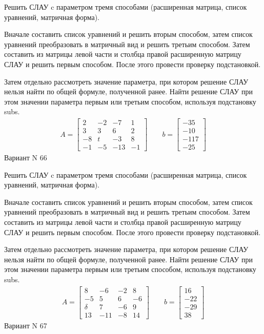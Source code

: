 \documentclass[11pt]{report}
\begin{document}
Решить СЛАУ c параметром тремя способами (расширенная матрица, список уравнений, матричная форма).

Вначале составить список уравнений и решить вторым способом,
затем список уравнений преобразовать в матричный вид и решить третьим способом.
Затем составить из матрицы левой части и столбца правой расширенную матрицу СЛАУ и решить первым способом.
После этого провести проверку подстановкой.

Затем отдельно рассмотреть значение параметра, при котором решение СЛАУ нельзя найти по общей формуле,
полученной ранее.
Найти решение СЛАУ при этом значении параметра первым или третьим способом, используя подстановку subs.
\begin{align*}
    A = \left[\begin{matrix}2 & -2 & -7 & 1\\3 & 3 & 6 & 2\\-8 & t & -3 & 8\\-1 & -5 & -13 & -1\end{matrix}\right]
\qquad b = \left[\begin{matrix}-35\\-10\\-117\\-25\end{matrix}\right]
\end{align*}
\newpage
Вариант N 66


Решить СЛАУ c параметром тремя способами (расширенная матрица, список уравнений, матричная форма).

Вначале составить список уравнений и решить вторым способом,
затем список уравнений преобразовать в матричный вид и решить третьим способом.
Затем составить из матрицы левой части и столбца правой расширенную матрицу СЛАУ и решить первым способом.
После этого провести проверку подстановкой.

Затем отдельно рассмотреть значение параметра, при котором решение СЛАУ нельзя найти по общей формуле,
полученной ранее.
Найти решение СЛАУ при этом значении параметра первым или третьим способом, используя подстановку subs.
\begin{align*}
    A = \left[\begin{matrix}8 & -6 & -2 & 8\\-5 & 5 & 6 & -6\\\delta & 7 & -6 & 9\\13 & -11 & -8 & 14\end{matrix}\right]
\qquad b = \left[\begin{matrix}16\\-22\\-29\\38\end{matrix}\right]
\end{align*}
\newpage
Вариант N 67
\end{document}
